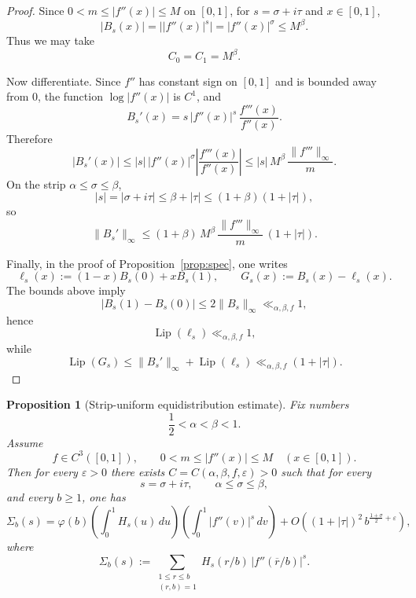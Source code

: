 \documentclass[a4paper,american,11pt]{amsart}
\theoremstyle{plain}
\newtheorem{proposition}[theorem]{Proposition}
\theoremstyle{definition}
\begin{document}
\begin{proof}
Since \(0<m\le |f''(x)|\le M\) on \([0,1]\), for \(s=\sigma+i\tau\) and \(x\in[0,1]\),
\[
|B_s(x)|
=
\bigl||f''(x)|^s\bigr|
=
|f''(x)|^\sigma
\le M^\beta.
\]
Thus we may take
\[
C_0=C_1=M^\beta.
\]

Now differentiate. Since \(f''\) has constant sign on \([0,1]\) and is bounded away from \(0\),
the function \(\log|f''(x)|\) is \(C^1\), and
\[
B_s'(x)
=
s\,|f''(x)|^s\,\frac{f'''(x)}{f''(x)}.
\]
Therefore
\[
|B_s'(x)|
\le
|s|\,|f''(x)|^\sigma\left|\frac{f'''(x)}{f''(x)}\right|
\le
|s|\,M^\beta\,\frac{\|f'''\|_\infty}{m}.
\]
On the strip \(\alpha\le \sigma\le \beta\),
\[
|s|=|\sigma+i\tau|\le \beta+|\tau|\le (1+\beta)(1+|\tau|),
\]
so
\[
\|B_s'\|_\infty
\le
(1+\beta)\,M^\beta\,\frac{\|f'''\|_\infty}{m}\,(1+|\tau|).
\]

Finally, in the proof of Proposition~\ref{prop:spec}, one writes
\[
\ell_s(x):=(1-x)B_s(0)+xB_s(1),
\qquad
G_s(x):=B_s(x)-\ell_s(x).
\]
The bounds above imply
\[
|B_s(1)-B_s(0)|\le 2\|B_s\|_\infty\ll_{\alpha,\beta,f}1,
\]
hence
\[
\operatorname{Lip}(\ell_s)\ll_{\alpha,\beta,f}1,
\]
while
\[
\operatorname{Lip}(G_s)\le \|B_s'\|_\infty+\operatorname{Lip}(\ell_s)
\ll_{\alpha,\beta,f}(1+|\tau|).
\]
\end{proof}

\begin{proposition}[Strip-uniform equidistribution estimate]
\label{prop:spec-strip}
Fix numbers
\[
\frac12<\alpha<\beta<1.
\]
Assume
\[
f\in C^3([0,1]),
\qquad
0<m\le |f''(x)|\le M
\quad (x\in[0,1]).
\]
Then for every \(\varepsilon>0\) there exists \(C=C(\alpha,\beta,f,\varepsilon)>0\) such that for every
\[
s=\sigma+i\tau,\qquad \alpha\le \sigma\le \beta,
\]
and every \(b\ge1\), one has
\[
\Sigma_b(s)
=
\varphi(b)\left(\int_0^1 H_s(u)\,du\right)\left(\int_0^1 |f''(v)|^s\,dv\right)
+
O\!\left((1+|\tau|)^2\,b^{\frac{1+\sigma}{2}+\varepsilon}\right),
\]
where
\[
\Sigma_b(s):=\sum_{\substack{1\le r\le b\\(r,b)=1}} H_s(r/b)\,|f''(\overline r/b)|^s.
\]
\end{proposition}
\end{document}
